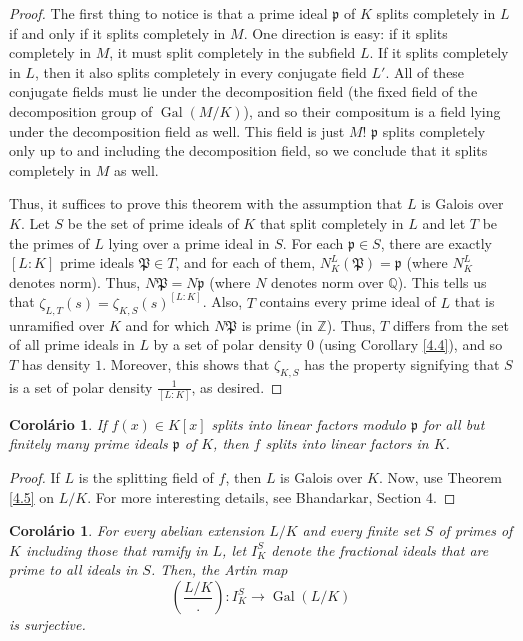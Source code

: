 \documentclass{article}
\DeclareMathOperator{\Gal}{Gal}
\newcommand{\QQ}{\mathbb{Q}}
\newcommand{\ZZ}{\mathbb{Z}}
\theoremstyle{plain}
\newtheorem{cor}[thm]{Corolário}
\theoremstyle{definition}
\theoremstyle{remark}
\numberwithin{equation}{section}
\numberwithin{thm}{section}
\begin{document}
\begin{proof}
The first thing to notice is that a prime ideal $\mathfrak{p}$ of $K$ splits completely in $L$ if and only if it splits completely in $M$. One direction is easy: if it splits completely in $M$, it must split completely in the subfield $L$. If it splits completely in $L$, then it also splits completely in every conjugate field $L'$. All of these conjugate fields must lie under the decomposition field (the fixed field of the decomposition group of $\Gal(M/K)$), and so their compositum is a field lying under the decomposition field as well. This field is just $M$! $\mathfrak{p}$ splits completely only up to and including the decomposition field, so we conclude that it splits completely in $M$ as well. 

Thus, it suffices to prove this theorem with the assumption that $L$ is Galois over $K$. Let $S$ be the set of prime ideals of $K$ that split completely in $L$ and let $T$ be the primes of $L$ lying over a prime ideal in $S$. For each $\mathfrak{p} \in S$, there are exactly $[L : K]$ prime ideals $\mathfrak{P} \in T$, and for each of them, $N_{K}^{L}(\mathfrak{P}) = \mathfrak{p}$ (where $N_{K}^{L}$ denotes norm). Thus, $N\mathfrak{P} = N\mathfrak{p}$ (where $N$ denotes norm over $\QQ$). This tells us that $\zeta_{L, T}(s) = \zeta_{K, S}(s)^{[L : K]}$. Also, $T$ contains every prime ideal of $L$ that is unramified over $K$ and for which $N\mathfrak{P}$ is prime (in $\ZZ$). Thus, $T$ differs from the set of all prime ideals in $L$ by a set of polar density $0$ (using Corollary \ref{4.4}), and so $T$ has density $1$. Moreover, this shows that $\zeta_{K, S}$ has the property signifying that $S$ is a set of polar density $\frac{1}{[L : K]}$, as desired.
\end{proof}

\begin{cor}
If $f(x) \in K[x]$ splits into linear factors modulo $\mathfrak{p}$ for all but finitely many prime ideals $\mathfrak{p}$ of $K$, then $f$ splits into linear factors in $K$.
\end{cor}

\begin{proof}
If $L$ is the splitting field of $f$, then $L$ is Galois over $K$. Now, use Theorem \ref{4.5} on $L/K$. For more interesting details, see Bhandarkar\cite{bhandarkar2018hilbert}, Section 4. 
\end{proof}

\begin{cor}
For every abelian extension $L/K$ and every finite set $S$ of primes of $K$ including those that ramify in $L$, let $I_{K}^{S}$ denote the fractional ideals that are prime to all ideals in $S$. Then, the Artin map $$\left(\frac{L/K}{.}\right) : I_{K}^{S} \longrightarrow \Gal(L/K)$$ is surjective. 
\end{cor}
\end{document}

